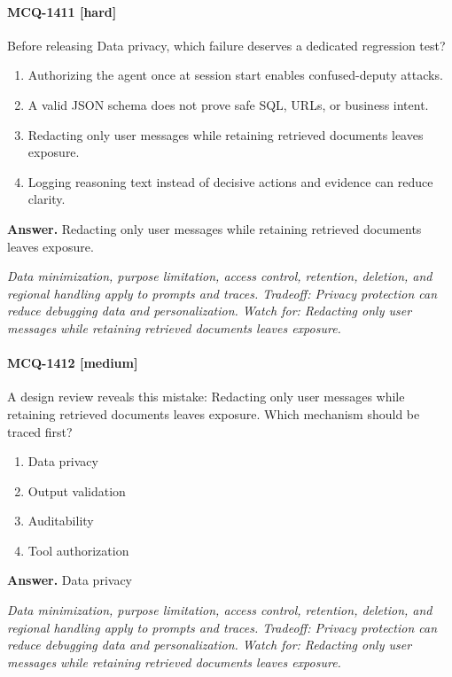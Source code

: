 \paragraph{MCQ-1411 [hard]} Before releasing Data privacy, which failure deserves a dedicated regression test?
\begin{enumerate}[label=\Alph*.]
\item Authorizing the agent once at session start enables confused-deputy attacks.
\item A valid JSON schema does not prove safe SQL, URLs, or business intent.
\item Redacting only user messages while retaining retrieved documents leaves exposure.
\item Logging reasoning text instead of decisive actions and evidence can reduce clarity.
\end{enumerate}
\noindent\textbf{Answer.} Redacting only user messages while retaining retrieved documents leaves exposure.
\par\textit{Data minimization, purpose limitation, access control, retention, deletion, and regional handling apply to prompts and traces. Tradeoff: Privacy protection can reduce debugging data and personalization. Watch for: Redacting only user messages while retaining retrieved documents leaves exposure.}
\paragraph{MCQ-1412 [medium]} A design review reveals this mistake: Redacting only user messages while retaining retrieved documents leaves exposure. Which mechanism should be traced first?
\begin{enumerate}[label=\Alph*.]
\item Data privacy
\item Output validation
\item Auditability
\item Tool authorization
\end{enumerate}
\noindent\textbf{Answer.} Data privacy
\par\textit{Data minimization, purpose limitation, access control, retention, deletion, and regional handling apply to prompts and traces. Tradeoff: Privacy protection can reduce debugging data and personalization. Watch for: Redacting only user messages while retaining retrieved documents leaves exposure.}
